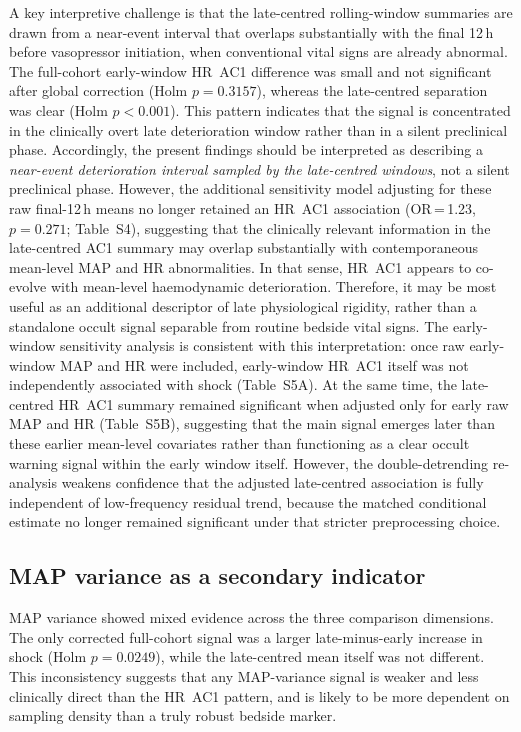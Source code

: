 \documentclass[referee,lineno,pdflatex]{sn-article-template/sn-jnl}
\begin{document}
A key interpretive challenge is that the late-centred rolling-window summaries are drawn
from a near-event interval that overlaps substantially with the final 12\,h before
vasopressor initiation, when conventional vital signs are already abnormal.
The full-cohort early-window HR~AC1 difference was small and not significant after
global correction (Holm $p = 0.3157$), whereas the late-centred separation was clear
(Holm $p<0.001$).
This pattern indicates that the signal is concentrated in the clinically overt
late deterioration window rather than in a silent preclinical phase.
Accordingly, the present findings should be interpreted as describing a
\emph{near-event deterioration interval sampled by the late-centred windows}, not a silent preclinical phase.
However, the additional sensitivity model adjusting for these raw final-12\,h means
no longer retained an HR~AC1 association (OR\,=\,1.23, $p = 0.271$; Table~S4),
suggesting that the clinically relevant information in the late-centred AC1 summary may overlap
substantially with contemporaneous mean-level MAP and HR abnormalities.
In that sense, HR~AC1 appears to co-evolve with mean-level haemodynamic deterioration.
Therefore, it may be most useful as an additional descriptor of late physiological rigidity,
rather than a standalone occult signal separable from routine bedside vital signs.
The early-window sensitivity analysis is consistent with this interpretation:
once raw early-window MAP and HR were included, early-window HR~AC1 itself was not
independently associated with shock (Table~S5A).
At the same time, the late-centred HR~AC1 summary remained significant when adjusted only for early
raw MAP and HR (Table~S5B), suggesting that the main signal emerges later than these
earlier mean-level covariates rather than functioning as a clear occult warning signal
within the early window itself.
However, the double-detrending re-analysis weakens confidence that the adjusted late-centred
association is fully independent of low-frequency residual trend, because the matched
conditional estimate no longer remained significant under that stricter preprocessing
choice.

\subsection{MAP variance as a secondary indicator}

MAP variance showed mixed evidence across the three comparison dimensions.
The only corrected full-cohort signal was a larger late-minus-early increase in shock
(Holm $p = 0.0249$), while the late-centred mean itself was not different.
This inconsistency suggests that any MAP-variance signal is weaker and less clinically
direct than the HR~AC1 pattern, and is likely to be more dependent on sampling density
than a truly robust bedside marker.
\end{document}
